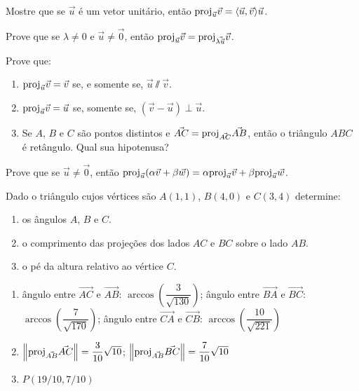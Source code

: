 \documentclass[12pt]{exam}
\begin{document}
\vspace{.3cm}

\questao{} Mostre que se $\vec{u}$ é um vetor unitário, então ${\rm proj}_{\vec{u}}\vec{v} = \langle \vec{u}, \vec{v} \rangle\vec{u}$.

\vspace{.3cm}

\questao{} Prove que se $\lambda \ne 0$ e $\vec{u} \ne \vec{0}$, então ${\rm proj}_{\vec{u}}\vec{v} = {\rm proj}_{\vec{\lambda\vec{u}}}\vec{v}$.

\vspace{.3cm}

\questao{} Prove que:
\begin{enumerate}[label=({\alph*})]
    \item ${\rm proj}_{\vec{u}}\vec{v} = \vec{v}$ se, e somente se, $\vec{u}\varparallel\vec{v}$.
    \item ${\rm proj}_{\vec{u}}\vec{v} = \vec{u}$ se, somente se, $(\vec{v} - \vec{u})\perp\vec{u}$.
    \item Se $A$, $B$ e $C$ são pontos distintos e $\vec{AC} = {\rm proj}_{\vec{AC}}\vec{AB}$, então o triângulo $ABC$ é retângulo. Qual sua hipotenusa?
\end{enumerate}

\vspace{.3cm}

\questao{} Prove que se $\vec{u} \ne \vec{0}$, então ${\rm proj}_{\vec{u}}(\alpha\vec{v} + \beta\vec{w}) = \alpha{\rm proj}_{\vec{u}}\vec{v} + \beta{\rm proj}_{\vec{u}}\vec{w}$.

\vspace{.3cm}

\questao{} Dado o triângulo cujos vértices são $A(1, 1)$, $B(4, 0)$ e $C(3, 4)$ determine:
\begin{enumerate}[label=({\alph*})]
    \item os ângulos $A$, $B$ e $C$.
    \item o comprimento das proje\c{c}\~oes dos lados $AC$ e $BC$ sobre o lado $AB$.
    \item o pé da altura relativo ao vértice $C$.
\end{enumerate}
\begin{solucao}
    \begin{enumerate}[label=({\alph*})]
        \item ângulo entre $\vec{AC}$ e $\vec{AB}$: $\arccos\left(\dfrac{3}{\sqrt{130}}\right)$; ângulo entre $\vec{BA}$ e $\vec{BC}$: $\arccos\left(\dfrac{7}{\sqrt{170}}\right)$; ângulo entre $\vec{CA}$ e $\vec{CB}$: $\arccos\left(\dfrac{10}{\sqrt{221}}\right)$
        \item $\left\Vert{{\rm proj}_{\vec{AB}}\vec{AC}}\right\Vert = \dfrac{3}{10}\sqrt{10}$; $\left\Vert{{\rm proj}_{\vec{AB}}\vec{BC}}\right\Vert = \dfrac{7}{10}\sqrt{10}$
        \item $P(19/10, 7/10)$
    \end{enumerate}
\end{solucao}
\end{document}
